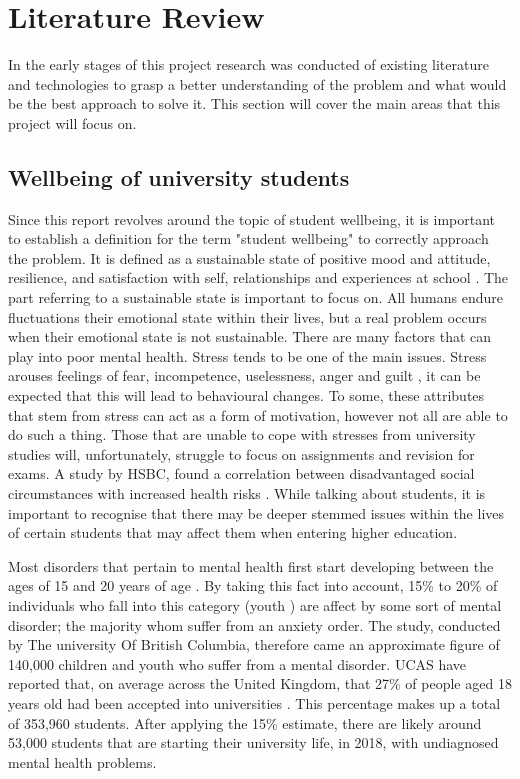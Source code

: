 \section{Literature Review} \label{litreview}

In the early stages of this project research was conducted of existing literature and technologies to grasp a better understanding of the problem and what would be the best approach to solve it.
This section will cover the main areas that this project will focus on.

\subsection{Wellbeing of university students}

Since this report revolves around the topic of student wellbeing, it is important to establish a definition for the term "student wellbeing" to correctly approach the problem.
It is defined as a sustainable state of positive mood and attitude, resilience, and satisfaction with self, relationships and experiences at school \cite{noble2008scoping}.
The part referring to a sustainable state is important to focus on. All humans endure fluctuations their emotional state within their lives, but a real problem occurs when their emotional state is not sustainable.
There are many factors that can play into poor mental health. Stress tends to be one of the main issues. 
Stress arouses feelings of fear, incompetence, uselessness, anger and guilt \cite{turunen2014indoor}, it can be expected that this will lead to behavioural changes. 
To some, these attributes that stem from stress can act as a form of motivation, however not all are able to do such a thing.
Those that are unable to cope with stresses from university studies will, unfortunately, struggle to focus on assignments and revision for exams.
A study by HSBC, found a correlation between disadvantaged social circumstances with increased health risks \cite{currie2009social}.
While talking about students, it is important to recognise that there may be deeper stemmed issues within the lives of certain students that may affect them when entering higher education.

Most disorders that pertain to mental health first start developing between the ages of 15 and 20 years of age \cite{kessler2005lifetime}.
By taking this fact into account, 15\% to 20\% of individuals who fall into this category (youth \cite{youth2017definition}) are affect by some sort of mental disorder; the majority whom suffer from an anxiety order. 
The study, conducted by The university Of British Columbia, therefore came an approximate figure of 140,000 children and youth who suffer from a mental disorder. 
UCAS have reported that, on average across the United Kingdom, that 27\% of people aged 18 years old had been accepted into universities \cite{ucas_2018}.
This percentage makes up a total of 353,960 students. 
After applying the 15\% estimate, there are likely around 53,000 students that are starting their university life, in 2018, with undiagnosed mental health problems.

